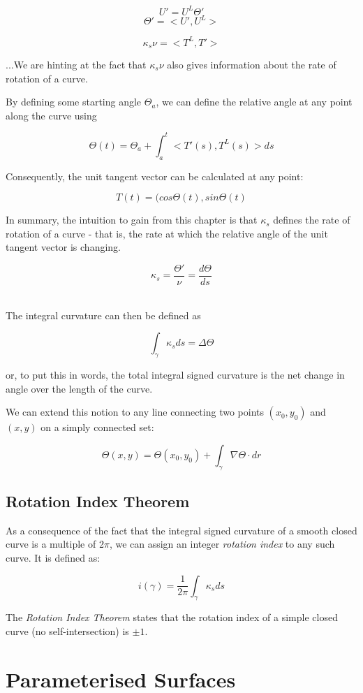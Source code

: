 \documentclass{article}
\begin{document}
\[ U' = U^L \Theta' \]
\[ \Theta' = <U', U^L> \]

\[\kappa_{s} \nu = <T^L, T'> \]

...We are hinting at the fact that $\kappa_{s} \nu$ also gives information about the rate of rotation of a curve.

By defining some starting angle $\Theta_{a}$, we can define the relative angle at any point along the curve using

\[ \Theta(t) = \Theta_{a} + \int_{a}^t <T'(s), T^L (s)> ds \]

Consequently, the unit tangent vector can be calculated at any point:

\[T(t) = (cos \Theta(t), sin \Theta(t) \]

In summary, the intuition to gain from this chapter is that $\kappa_{s}$ defines the rate of rotation of a curve - that is, the rate at which the relative angle of the unit tangent vector is changing.

\[ \kappa_{s} = \frac{\Theta'}{\nu} = \frac{d\Theta}{ds} \]\

The integral curvature can then be defined as

\[ \int_{\gamma} \kappa_{s} ds = \Delta \Theta \]

or, to put this in words, the total integral signed curvature is the net change in angle over the length of the curve.

We can extend this notion to any line connecting two points $(x_0 , y_0 )$ and $(x,y)$ on a simply connected set:

\[ \Theta(x,y) = \Theta(x_0 , y_0 ) + \int_{\gamma} \nabla \Theta \cdot dr \]

\subsection{Rotation Index Theorem}

As a consequence of the fact that the integral signed curvature of a smooth closed curve is a multiple of 2$\pi$, we can assign an integer {\it{rotation index}} to any such curve. It is defined as:

\[ i(\gamma) = \frac{1}{2\pi} \int_{\gamma} \kappa_{s} ds \]

The {\it{Rotation Index Theorem}} states that the rotation index of a simple closed curve (no self-intersection) is $\pm 1$.

\section{Parameterised Surfaces}
\end{document}

